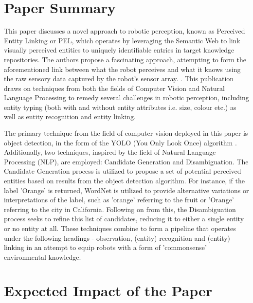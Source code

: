 \documentclass[a4paper,9pt]{scrartcl}
\title{\titletext}
\author{Michael Rice}
\begin{document}
\maketitle
\section{Paper Summary}
This paper discusses a novel approach to robotic perception,  known as Perceived Entity Linking or PEL, which operates by 
leveraging the Semantic Web to link visually perceived entities to uniquely identifiable entries in target knowledge repositories. The authors propose 
a fascinating approach, attempting to form the aforementioned link between what the robot perceives and what it knows using the raw sensory data 
captured by the robot's sensor array. \cite{adamikAdvancingRoboticPerception2024}. This publication draws on techniques from both the fields of 
Computer Vision and Natural Language Processing to remedy several challenges in robotic perception, including entity typing (both 
with and without entity attributes i.e. size, colour etc.) as well as entity recognition and entity linking. 

The primary technique from the field of computer vision deployed in this paper is object detection, in the form of the YOLO (You Only Look Once) 
algorithm \cite{redmonYouOnlyLook2016}. Additionally, two techniques, inspired by the field of Natural Language Processing (NLP), are employed: Candidate 
Generation and Disambiguation. The Candidate Generation process is utilized to propose a set of potential perceived entities based on results from the
object detection algorithm. For instance, if the label 'Orange' is returned, WordNet \cite{WordNetLexicalDatabase} is utilized to provide alternative 
variations or interpretations of the label, such as 'orange' referring to the fruit or 'Orange' referring to the city in California. Following on from this, 
the Disambiguation process seeks to refine this list of candidates, reducing it to either a single entity or no entity at all. These techniques combine to 
form a pipeline that operates under the following headings - observation, (entity) recognition and (entity) linking \cite{adamikAdvancingRoboticPerception2024} in 
an attempt to equip robots with a form of 'commonsense' environmental knowledge. 




\section{Expected Impact of the Paper}
\end{document}
